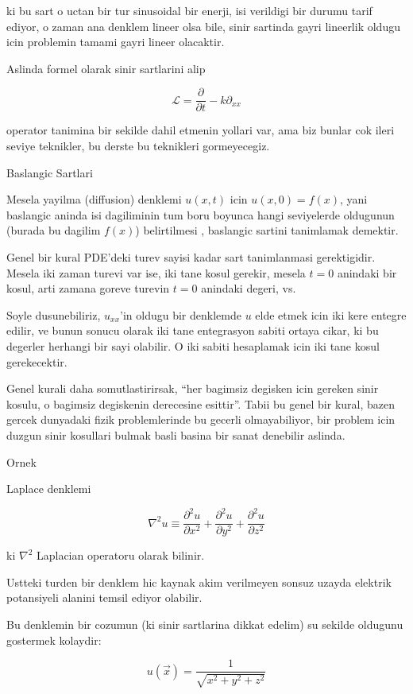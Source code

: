 \documentclass[12pt,fleqn]{article}
\begin{document}
ki bu sart o uctan bir tur sinusoidal bir enerji, isi verildigi bir durumu
tarif ediyor, o zaman ana denklem lineer olsa bile, sinir sartinda gayri
lineerlik oldugu icin problemin tamami gayri lineer olacaktir. 

Aslinda formel olarak sinir sartlarini alip 

\[ \mathcal{L}  = \frac{\partial }{\partial t} - k \partial_{xx}\]

operator tanimina bir sekilde dahil etmenin yollari var, ama biz bunlar cok
ileri seviye teknikler, bu derste bu teknikleri gormeyecegiz. 

Baslangic Sartlari

Mesela yayilma (diffusion) denklemi $u(x,t)$ icin $u(x,0) = f(x)$, yani
baslangic aninda isi dagiliminin tum boru boyunca hangi seviyelerde
oldugunun (burada bu dagilim $f(x)$) belirtilmesi , baslangic sartini
tanimlamak demektir.

Genel bir kural PDE'deki turev sayisi kadar sart tanimlanmasi
gerektigidir. Mesela iki zaman turevi var ise, iki tane kosul gerekir,
mesela $t=0$ anindaki bir kosul, arti zamana goreve turevin $t=0$ anindaki
degeri, vs. 

Soyle dusunebiliriz, $u_{xx}$'in oldugu bir denklemde $u$ elde etmek icin
iki kere entegre edilir, ve bunun sonucu olarak iki tane entegrasyon sabiti
ortaya cikar, ki bu degerler herhangi bir sayi olabilir. O iki sabiti
hesaplamak icin iki tane kosul gerekecektir. 

Genel kurali daha somutlastirirsak, ``her bagimsiz degisken icin gereken
sinir kosulu, o bagimsiz degiskenin derecesine esittir''. Tabii bu genel
bir kural, bazen gercek dunyadaki fizik problemlerinde bu gecerli
olmayabiliyor, bir problem icin duzgun sinir kosullari bulmak basli basina
bir sanat denebilir aslinda. 

Ornek

Laplace denklemi

\[ \nabla^2 u \equiv \frac{\partial ^2u}{\partial x^2} + 
\frac{\partial ^2u}{\partial y^2}  +
\frac{\partial ^2u}{\partial z^2} 
\]

ki $\nabla^2$ Laplacian operatoru olarak bilinir. 

Ustteki turden bir denklem hic kaynak akim verilmeyen sonsuz uzayda
elektrik potansiyeli alanini temsil ediyor olabilir. 

Bu denklemin bir cozumun (ki sinir sartlarina dikkat edelim) su sekilde
oldugunu gostermek kolaydir:

\[ u(\vec{x}) = \frac{1}{\sqrt{x^2+y^2+z^2}} \]
\end{document}
